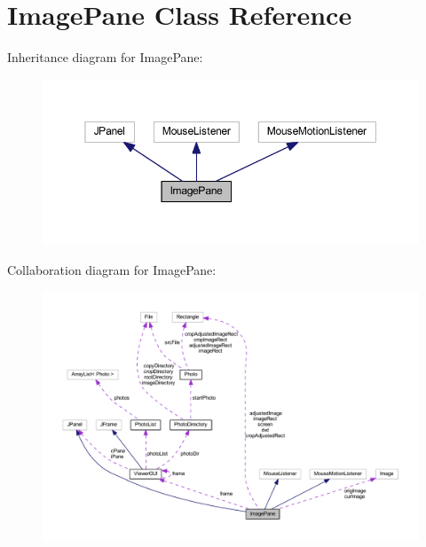 \hypertarget{class_image_pane}{\section{Image\-Pane Class Reference}
\label{class_image_pane}
}


Inheritance diagram for Image\-Pane\-:
\nopagebreak
\begin{figure}[H]
\begin{center}
\leavevmode
\includegraphics[width=350pt]{class_image_pane__inherit__graph}
\end{center}
\end{figure}


Collaboration diagram for Image\-Pane\-:
\nopagebreak
\begin{figure}[H]
\begin{center}
\leavevmode
\includegraphics[width=350pt]{class_image_pane__coll__graph}
\end{center}
\end{figure}
